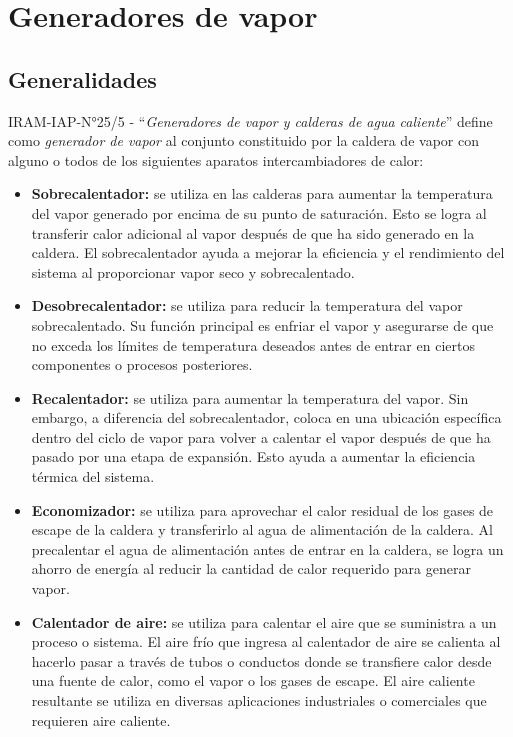 \section{Generadores de vapor}

\subsection{Generalidades}

	IRAM-IAP-N°25/5 - ``\textit{Generadores de vapor y calderas de agua caliente}'' define como \textit{generador de vapor} al conjunto constituido por la caldera de vapor con alguno o todos de los siguientes aparatos intercambiadores de calor:
	\begin{itemize}
		\item \textbf{Sobrecalentador:} se utiliza en las calderas para aumentar la temperatura del vapor generado por encima de su punto de saturación. Esto se logra al transferir calor adicional al vapor después de que ha sido generado en la caldera. El sobrecalentador ayuda a mejorar la eficiencia y el rendimiento del sistema al proporcionar vapor seco y sobrecalentado.
		
		\item \textbf{Desobrecalentador:} se utiliza para reducir la temperatura del vapor sobrecalentado. Su función principal es enfriar el vapor y asegurarse de que no exceda los límites de temperatura deseados antes de entrar en ciertos componentes o procesos posteriores.
		
		\item \textbf{Recalentador:} se utiliza para aumentar la temperatura del vapor. Sin embargo, a diferencia del sobrecalentador, coloca en una ubicación específica dentro del ciclo de vapor para volver a calentar el vapor después de que ha pasado por una etapa de expansión. Esto ayuda a aumentar la eficiencia térmica del sistema.
		
		\item \textbf{Economizador:} se utiliza para aprovechar el calor residual de los gases de escape de la caldera y transferirlo al agua de alimentación de la caldera. Al precalentar el agua de alimentación antes de entrar en la caldera, se logra un ahorro de energía al reducir la cantidad de calor requerido para generar vapor.
		
		\item \textbf{Calentador de aire:} se utiliza para calentar el aire que se suministra a un proceso o sistema. El aire frío que ingresa al calentador de aire se calienta al hacerlo pasar a través de tubos o conductos donde se transfiere calor desde una fuente de calor, como el vapor o los gases de escape. El aire caliente resultante se utiliza en diversas aplicaciones industriales o comerciales que requieren aire caliente.
	\end{itemize}

